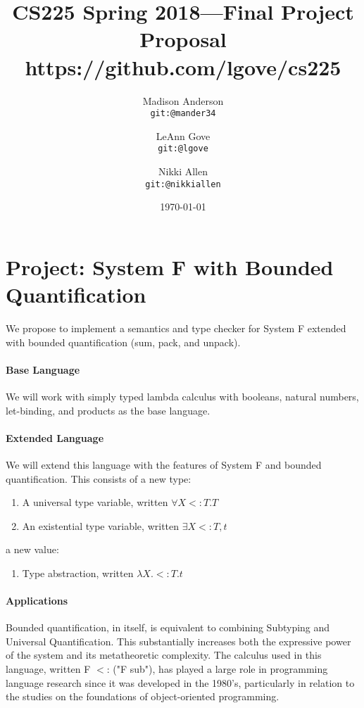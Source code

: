 \documentclass{article}
\title{CS225 Spring 2018---Final Project Proposal \\
\large https://github.com/lgove/cs225}
\author{
Madison Anderson \\ \small{\texttt{git:@mander34}}
\and LeAnn Gove \\ \small{\texttt{git:@lgove}}
\and Nikki Allen \\ \small{\texttt{git:@nikkiallen}}
}
\date{\today}
\begin{document}
\maketitle

\section*{Project: System F with Bounded Quantification}

We propose to implement a semantics and type checker for System F extended with
bounded quantification (sum, pack, and unpack).

\paragraph{Base Language}

We will work with simply typed lambda calculus with booleans, natural numbers,
let-binding, and products as the base language.

\paragraph{Extended Language}

We will extend this language with the features of System F and bounded quantification. This consists of a new type:
\begin{enumerate}
\item A universal type variable, written $\forall X< : T.T$
\item An existential type variable, written { $\exists X < :T,t $}
\end{enumerate}
a new value:
\begin{enumerate}
\item Type abstraction, written $\lambda X.< : T. t$


\end{enumerate}


\paragraph{Applications}

Bounded quantification, in itself, is equivalent to combining Subtyping and Universal Quantification. This substantially increases both the expressive power of the system and its metatheoretic complexity. The calculus used in this language, written F $<$: ("F sub"), has played a large role in programming language research since it was developed in the 1980's, particularly in relation to the studies on the foundations of object-oriented programming.
\end{document}
